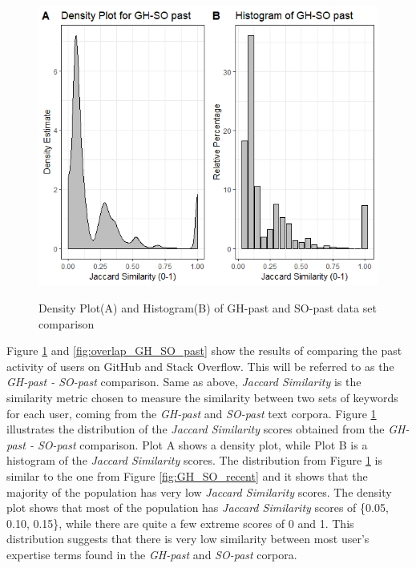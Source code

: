         \begin{figure}
          \centering
          \includegraphics[width=\textwidth]{figures/GH_SO_past.jpeg}\\
          \caption{Density Plot(A) and Histogram(B) of GH-past and SO-past data set comparison}
          \label{fig:GH_SO_past}
        \end{figure}
        
        Figure \ref{fig:GH_SO_past} and \ref{fig:overlap_GH_SO_past} show the results of comparing the past activity of users on GitHub and Stack Overflow. This will be referred to as the \emph{GH-past - SO-past} comparison. Same as above, \emph{Jaccard Similarity} is the similarity metric chosen to measure the similarity between two sets of keywords for each user, coming from the \emph{GH-past} and \emph{SO-past} text corpora. Figure \ref{fig:GH_SO_past} illustrates the distribution of the \emph{Jaccard Similarity} scores obtained from the \emph{GH-past - SO-past} comparison. Plot A shows a density plot, while Plot B is a  histogram of the \emph{Jaccard Similarity} scores. The distribution from Figure \ref{fig:GH_SO_past} is similar to the one from Figure \ref{fig:GH_SO_recent} and it shows that the majority of the population has very low \emph{Jaccard Similarity} scores. The density plot shows that most of the population has \emph{Jaccard Similarity} scores of \{0.05, 0.10, 0.15\}, while there are quite a few extreme scores of 0 and 1. This distribution suggests that there is very low similarity between most user's expertise terms found in the \emph{GH-past} and \emph{SO-past} corpora. 
        
